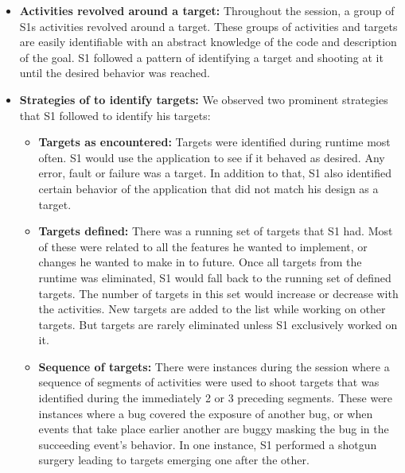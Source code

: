\begin{itemize}

\item \textbf{Activities revolved around a target:} Throughout the session, a group of S1\textquotesingle s activities revolved around a target. These groups of activities and targets are easily identifiable with an abstract knowledge of the code and description of the goal. S1 followed a pattern of identifying a target and shooting  at it until the desired behavior was reached.

\vspace{5pt}

\item \textbf{Strategies of to identify targets:} We observed two prominent strategies that S1 followed to identify his targets:
\vspace{5pt}
\begin{itemize}
\item \textbf{Targets as encountered:}  Targets were identified during runtime most often. S1 would use the application to see if it behaved as desired. Any error, fault or failure was a target. In addition to that, S1 also identified certain behavior of the application that did not match his design as a target.
\vspace{5pt}
\item \textbf{Targets defined:} There was a running set of targets that S1 had. Most of these were related to all the features he wanted to implement, or changes he wanted to make in to future. Once all targets from the runtime was eliminated, S1 would fall back to the running set of defined targets. The number of targets in this set would increase or decrease with the activities. New targets are added to the list while working on other targets. But targets are rarely eliminated unless S1 exclusively worked on it.
\vspace{5pt}
\item \textbf{Sequence of targets:} There were instances during the session where a sequence of segments of activities were used to shoot targets that was identified during the immediately 2 or 3 preceding segments. These were instances where a bug covered the exposure of another bug, or when events that take place earlier another are buggy masking the bug in the succeeding event's behavior. In one instance, S1 performed a shotgun surgery leading to targets emerging one after the other.
\end{itemize}
\vspace{5pt}


\end{itemize}
